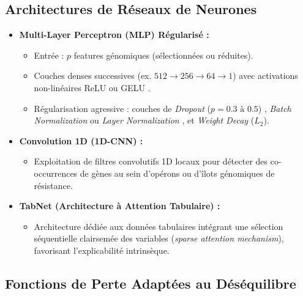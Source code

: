 \documentclass[11pt,a4paper]{article}
\begin{document}
\subsection{Architectures de Réseaux de Neurones}

\begin{itemize}[leftmargin=*, label=$\bullet$]
    \item \textbf{Multi-Layer Perceptron (MLP) Régularisé \citep{goodfellow2016deep} :}
    \begin{itemize}
        \item Entrée : $p$ features génomiques (sélectionnées ou réduites).
        \item Couches denses successives (ex. $512 \rightarrow 256 \rightarrow 64 \rightarrow 1$) avec activations non-linéaires ReLU \citep{nair2010rectified} ou GELU \citep{hendrycks2016gelu}.
        \item Régularisation agressive : couches de \textit{Dropout} ($p=0.3 \text{ à } 0.5$) \citep{srivastava2014dropout}, \textit{Batch Normalization} \citep{ioffe2015batch} ou \textit{Layer Normalization} \citep{ba2016layer}, et \textit{Weight Decay} ($L_2$).
    \end{itemize}

    \item \textbf{Convolution 1D (1D-CNN) \citep{lecun1998gradient,kim2014convolutional} :}
    \begin{itemize}
        \item Exploitation de filtres convolutifs 1D locaux pour détecter des co-occurrences de gènes au sein d'opérons ou d'îlots génomiques de résistance.
    \end{itemize}

    \item \textbf{TabNet (Architecture à Attention Tabulaire) \citep{arik2021tabnet} :}
    \begin{itemize}
        \item Architecture dédiée aux données tabulaires intégrant une sélection séquentielle clairsemée des variables (\textit{sparse attention mechanism}), favorisant l'explicabilité intrinsèque.
    \end{itemize}
\end{itemize}

\subsection{Fonctions de Perte Adaptées au Déséquilibre}
\end{document}
